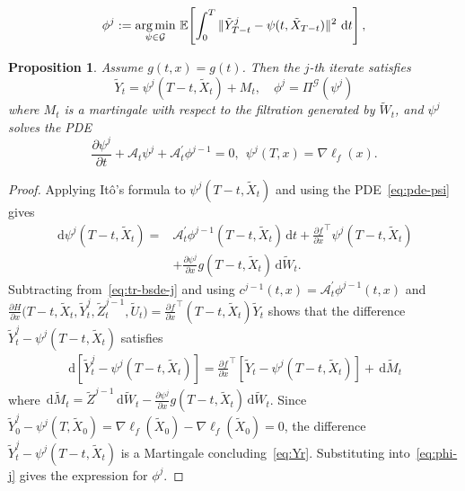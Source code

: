 \documentclass[10pt,a4paper]{amsart}
\newtheorem{proposition}{Proposition}
\newcommand{\Ur}{\tilde U}
\newcommand{\Xr}{\tilde X}
\newcommand{\Yr}{\tilde Y}
\newcommand{\Zr}{\tilde Z}
\def\argmin{\mathop{\text{\rm arg\,min}}}
\newcommand{\ud}{\,\mathrm{d}}
\begin{document}
\begin{equation}\label{eq:phi-j}
    \phi^j := \argmin_{\psi \in \mathcal{G}}\, \mathbb{E}\!\left[\int_0^T
    \|\tilde{Y}^j_{T-t} - \psi(t,\tilde{X}_{T-t})\|^2\,\ud t\right],
\end{equation}

\begin{proposition}
Assume $g(t,x)=g(t)$. Then the $j$-th iterate satisfies
\begin{equation}\label{eq:Yr}
   \Yr_t = \psi^j(T-t,\Xr_t) + M_t,\quad \phi^j = \Pi^{\mathcal G} (\psi^j)
\end{equation}
where $M_t$ is a martingale with respect to the filtration generated by 
$\tilde{W}_t$, and $\psi^j$ solves the PDE
\begin{equation}\label{eq:pde-psi}
    \frac{\partial \psi^j}{\partial t} + \mathcal A_t\psi^j + \mathcal A^\prime_t \phi^{j-1} = 0, ~~\psi^j(T,x) = \nabla \ell_f(x). 
\end{equation}
\end{proposition}

\begin{proof}
Applying It\^{o}'s formula to $\psi^j(T-t,\tilde{X}_t)$ and using 
the PDE~\eqref{eq:pde-psi} gives
\begin{align*}
    \ud \psi^j(T-t,\tilde X_t) 
    = &\mathcal A^\prime_t \phi^{j-1}(T-t,\tilde X_t) \ud t + \frac{\partial f}{\partial x}^\top \psi^j(T-t,\tilde X_t) \\&+\frac{\partial \psi^j}{\partial x}g(T-t,\tilde X_t) \ud \tilde W_t.
\end{align*}
Subtracting from~\eqref{eq:tr-bsde-j} and using $c^{j-1}(t,x)=\mathcal A^\prime_t \phi^{j-1}(t,x)$ and $\frac{\partial H}{\partial x}\big(T-t,\Xr_t,\Yr^j_t,\Zr^{j-1}_t,\Ur_t\big)=\frac{\partial f}{\partial x}^\top(T-t,\tilde X_t)\tilde Y_t$ shows that the difference $\tilde{Y}^j_t - \psi^j(T-t,\tilde{X}_t)$ satisfies
\begin{align*}
    \ud \left[\Yr^j_t - \psi^j(T-t,\tilde X_t)\right] = \frac{\partial f}{\partial x}^\top\left[\Yr_t - \psi^j(T-t,\tilde X_t)\right] + \ud \tilde M_t
\end{align*}
where $\ud \tilde M_t = \Zr^{j-1} \ud \tilde W_t-\frac{\partial \psi^j}{\partial x}g(T-t,\tilde X_t) \ud \tilde W_t$. Since $\tilde Y^j_0 - \psi^j(T,\tilde X_0) = \nabla \ell_f(\tilde X_0)-\nabla \ell_f(\tilde X_0)=0$, the difference $\Yr^j_t - \psi^j(T-t,\tilde X_t)$ is a Martingale concluding~\eqref{eq:Yr}. Substituting 
into~\eqref{eq:phi-j} gives the expression for $\phi^j$.
\end{proof}
\end{document}
